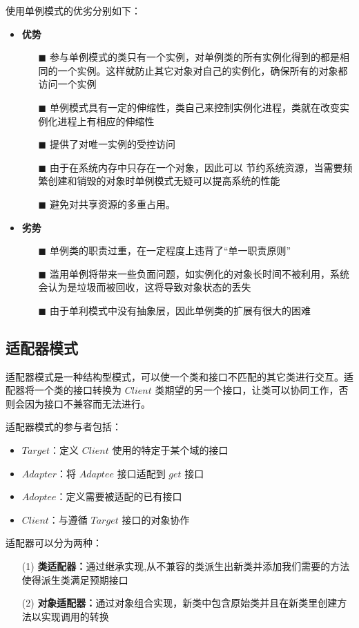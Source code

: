 \documentclass[article]{BJTU-thesis}
\begin{document}
	使用单例模式的优劣分别如下：
	\begin{itemize}
		\item \textbf{优势}
		\begin{itemize}
			\item[$\blacksquare$] 参与单例模式的类只有一个实例，对单例类的所有实例化得到的都是相同的一个实例。这样就防止其它对象对自己的实例化，确保所有的对象都访问一个实例 
			\item[$\blacksquare$] 单例模式具有一定的伸缩性，类自己来控制实例化进程，类就在改变实例化进程上有相应的伸缩性
			\item[$\blacksquare$] 提供了对唯一实例的受控访问
			\item[$\blacksquare$] 由于在系统内存中只存在一个对象，因此可以 节约系统资源，当需要频繁创建和销毁的对象时单例模式无疑可以提高系统的性能
			\item[$\blacksquare$] 避免对共享资源的多重占用。 
		\end{itemize}
			\item \textbf{劣势}
	\begin{itemize}
		\item[$\blacksquare$] 单例类的职责过重，在一定程度上违背了“单一职责原则”
		\item[$\blacksquare$] 滥用单例将带来一些负面问题，如实例化的对象长时间不被利用，系统会认为是垃圾而被回收，这将导致对象状态的丢失
		\item[$\blacksquare$] 由于单利模式中没有抽象层，因此单例类的扩展有很大的困难
	\end{itemize}
	\end{itemize}
\subsection{适配器模式}
适配器模式是一种结构型模式，可以使一个类和接口不匹配的其它类进行交互。适配器将一个类的接口转换为 $Client$ 类期望的另一个接口，让类可以协同工作，否则会因为接口不兼容而无法进行。

适配器模式的参与者包括：
\begin{itemize}
	\item $Target$：定义 $Client$ 使用的特定于某个域的接口
	\item $Adapter$：将 $Adaptee$ 接口适配到 $get$ 接口
	\item $Adoptee$：定义需要被适配的已有接口
	\item $Client$：与遵循 $Target$ 接口的对象协作
\end{itemize}

适配器可以分为两种：
\begin{enumerate}
	\item[(1)] \textbf{类适配器：}通过继承实现,从不兼容的类派生出新类并添加我们需要的方法使得派生类满足预期接口
	\item[(2)] \textbf{对象适配器：}通过对象组合实现，新类中包含原始类并且在新类里创建方法以实现调用的转换
\end{enumerate}
\end{document}
